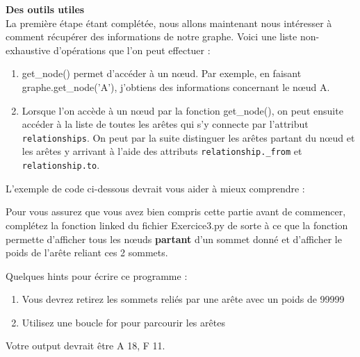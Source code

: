 \begin{Exercice}[10 minutes]\textbf{Des outils utiles}\\
    La première étape étant complétée, nous allons maintenant nous intéresser à comment récupérer des informations de notre graphe. Voici une liste non-exhaustive d'opérations que l'on peut effectuer :\\
    \begin{enumerate}
        \item get\_node() permet d'accéder à un nœud. Par exemple, en faisant graphe.get\_node('A'), j'obtiens des informations concernant le nœud A.
        \item Lorsque l'on accède à un nœud par la fonction get\_node(), on peut ensuite accéder à la liste de toutes les arêtes qui s'y connecte par l'attribut \lstinline{relationships}. On peut par la suite distinguer les arêtes partant du nœud et les arêtes y arrivant à l'aide des attributs \lstinline{relationship._from} et \lstinline{relationship.to}.
    \end{enumerate}
    
    L'exemple de code ci-dessous devrait vous aider à mieux comprendre :
    
    
    Pour vous assurez que vous avez bien compris cette partie avant de commencer, complétez la fonction linked du fichier Exercice3.py de sorte à ce que la fonction permette d'afficher tous les nœuds \textbf{partant} d'un sommet donné et d'afficher le poids de l'arête reliant ces 2 sommets.\\
    
    
    \begin{conseil}
        Quelques hints pour écrire ce programme :
        \begin{enumerate}
            \item Vous devrez retirez les sommets reliés par une arête avec un poids de 99999
            \item Utilisez une boucle for pour parcourir les arêtes
        \end{enumerate}
    Votre output devrait être A 18, F 11.
    \end{conseil}
    \begin{solution}
        
    \end{solution}
\end{Exercice}
\newpage
